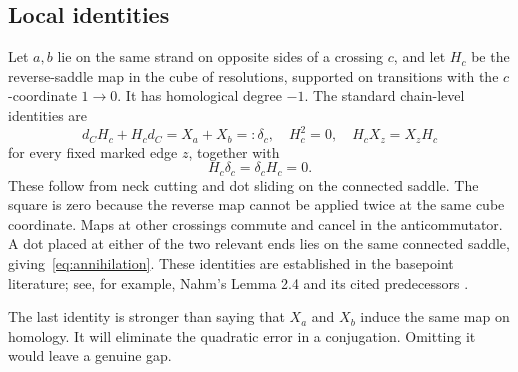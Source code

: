 \documentclass[11pt]{article}
\theoremstyle{definition}\newtheorem{definition}[theorem]{Definition}\newtheorem{example}[theorem]{Example}
\theoremstyle{remark}\newtheorem{remark}[theorem]{Remark}
\begin{document}
\subsection{Local identities}
Let $a,b$ lie on the same strand on opposite sides of a crossing $c$, and let $H_c$ be the reverse-saddle map in the cube of resolutions, supported on transitions with the $c$-coordinate $1\to0$. It has homological degree $-1$. The standard chain-level identities are
\begin{equation}\label{eq:slide}
 d_CH_c+H_cd_C=X_a+X_b=:\delta_c,
 \quad H_c^2=0,
 \quad H_cX_z=X_zH_c
\end{equation}
for every fixed marked edge $z$, together with
\begin{equation}\label{eq:annihilation}
 H_c\delta_c=\delta_cH_c=0.
\end{equation}
These follow from neck cutting and dot sliding on the connected saddle. The square is zero because the reverse map cannot be applied twice at the same cube coordinate. Maps at other crossings commute and cancel in the anticommutator. A dot placed at either of the two relevant ends lies on the same connected saddle, giving~\eqref{eq:annihilation}. These identities are established in the basepoint literature; see, for example, Nahm's Lemma 2.4 and its cited predecessors \cite{Nahm,BLS}.

The last identity is stronger than saying that $X_a$ and $X_b$ induce the same map on homology. It will eliminate the quadratic error in a conjugation. Omitting it would leave a genuine gap.
\end{document}
